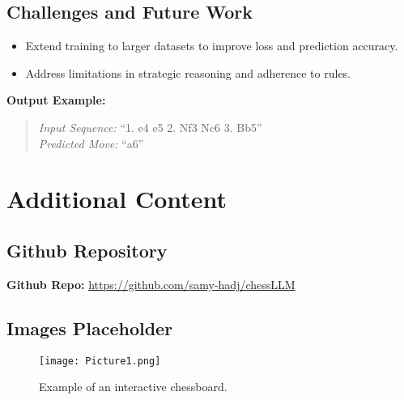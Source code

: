 \documentclass[11pt]{article}
\begin{document}
\subsection{Challenges and Future Work}
\begin{itemize}
    \item Extend training to larger datasets to improve loss and prediction accuracy.
    \item Address limitations in strategic reasoning and adherence to rules.
\end{itemize}

\textbf{Output Example:}
\begin{quote}
\emph{Input Sequence:} ``1. e4 e5 2. Nf3 Nc6 3. Bb5'' \\
\emph{Predicted Move:} ``a6''
\end{quote}

\section{Additional Content}
\subsection{Github Repository}
\textbf{Github Repo:} \url{https://github.com/samy-hadj/chessLLM}\\

\subsection{Images Placeholder}
\begin{figure}[h!]
    \texttt{[image: Picture1.png]}
    \caption{Example of an interactive chessboard.}
    \label{fig:chessboard}
\end{figure}
\end{document}
